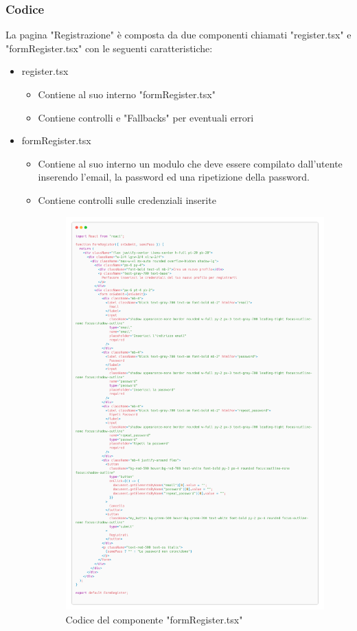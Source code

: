 \documentclass{report}
\begin{document}
\subsubsection*{Codice}
La pagina "Registrazione" è composta da due componenti chiamati "register.tsx" e "formRegister.tsx" con le seguenti caratteristiche:
\begin{itemize}
	\item register.tsx
	\begin{itemize}
		\item Contiene al suo interno "formRegister.tsx"
		\item Contiene controlli e "Fallbacks" per eventuali errori
	\end{itemize}
	\item formRegister.tsx
	\begin{itemize}
		\item Contiene al suo interno un modulo che deve essere compilato dall'utente inserendo l'email, la password ed una ripetizione della password.
		\item Contiene controlli sulle credenziali inserite
		\begin{figure}[H]
			\centering\includegraphics[width=1\textwidth]{images/microservizio-autenticazione/frontend/formRegister-carbon.png}
			Codice del componente "formRegister.tsx"
		\end{figure}
	\end{itemize}
\end{itemize}
\end{document}
